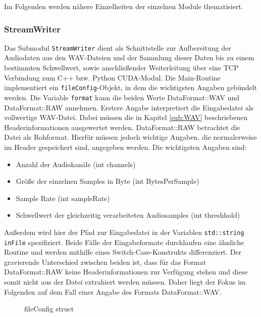 Im Folgenden werden nähere Einzelheiten der einzelnen Module thematisiert.

\subsubsection{StreamWriter}
\label{sub:StreamWriter}

Das Submodul \texttt{StreamWriter} dient als Schnittstelle zur Aufbereitung der Audiodaten aus den WAV-Dateien und der Sammlung dieser Daten bis zu einem bestimmten Schwellwert, sowie anschließender Weiterleitung über eine TCP Verbindung zum C++ bzw. Python CUDA-Modul. Die Main-Routine implementiert ein \texttt{fileConfig}-Objekt, in dem die wichtigsten Angaben gebündelt werden. Die Variable \texttt{format} kann die beiden Werte DataFormat::WAV und DataFormat::RAW annehmen. Erstere Angabe interpretiert die Eingabedatei als vollwertige WAV-Datei. Dabei müssen die in Kapitel \ref{sub:WAV} beschriebenen Headerinformationen ausgewertet werden. DataFormat::RAW betrachtet die Datei als Rohformat. Hierfür müssen jedoch wichtige Angaben, die normalerweise im Header gespeichert sind, angegeben werden. Die wichtigsten Angaben sind:
\begin{itemize}
	\item Anzahl der Audiokanäle (int channels)
	\item Größe der einzelnen Samples in Byte (int BytesPerSample)
	\item Sample Rate (int sampleRate)
	\item Schwellwert der gleichzeitig verarbeiteten Audiosamples (int threshhold)
\end{itemize}

Außerdem wird hier der Pfad zur Eingabedatei in der Variablen \texttt{std::string inFile} spezifiziert.
Beide Fälle der Eingabeformate durchlaufen eine ähnliche Routine und werden mithilfe eines Switch-Case-Konstrukts differenziert. Der gravierende Unterschied zwischen beiden ist, dass für das Format DataFormat::RAW keine Headerinformationen zur Verfügung stehen und diese somit nicht aus der Datei extrahiert werden müssen. Daher liegt der Fokus im Folgenden auf dem Fall einer Angabe des Formats DataFormat::WAV.

\begin{figure}[h!]
	
	\caption{fileConfig struct}
	\label{fig:fileConfig}
\end{figure}

